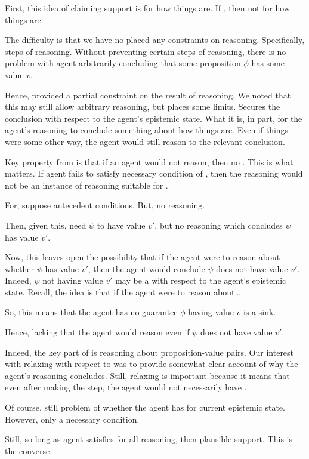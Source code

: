 \begin{note}
  First, this idea of claiming support is for how things are.
  If \epVW{}, then not for how things are.

  The difficulty is that we have no placed any constraints on reasoning.
  Specifically, steps of reasoning.
  Without preventing certain steps of reasoning, there is no problem with agent arbitrarily concluding that some proposition \(\phi\) has some value \(v\).

  Hence, \ideaS{} provided a partial constraint on the result of reasoning.
  We noted that this may still allow arbitrary reasoning, but \ideaS{} places some limits.
  Secures the conclusion with respect to the agent's epistemic state.
  What it is, in part, for the agent's reasoning to conclude something about how things are.
  Even if things were some other way, the agent would still reason to the relevant conclusion.
\end{note}

\begin{note}
  Key property from \ideaS{} is that if an agent would not reason, then no \support{}.
  This is what matters.
  If agent fails to satisfy necessary condition of \ideaCS{}, then the reasoning would not be an instance of reasoning suitable for \support{}.

  For, suppose antecedent conditions.
  But, no reasoning.

  Then, given this, need \(\psi\) to have value \(v'\), but no reasoning which concludes \(\psi\) has value \(v'\).

  Now, this leaves open the possibility that if the agent were to reason about whether \(\psi\) has value \(v'\), then the agent would conclude \(\psi\) does not have value \(v'\).
  Indeed, \(\psi\) not having value \(v'\) may be a \sink{} with respect to the agent's epistemic state.
  Recall, the idea is that if the agent were to reason about\dots

  So, this means that the agent has no guarantee \(\phi\) having value \(v\) is a sink.

  Hence, lacking that the agent would reason even if \(\psi\) does not have value \(v'\).

  Indeed, the key part of \ideaS{} is reasoning about \epVAd{} proposition-value pairs.
  Our interest with relaxing with respect to \ideaS{} was to provide somewhat clear account of why the agent's reasoning concludes.
  Still, relaxing is important because it means that even after making the step, the agent would not necessarily have \support{}.

  Of course, still problem of whether the agent has \support{} for current epistemic state.
  However, only a necessary condition.

  Still, so long as agent satisfies \ideaCS{} for all reasoning, then plausible support.
  This is the converse.
\end{note}

